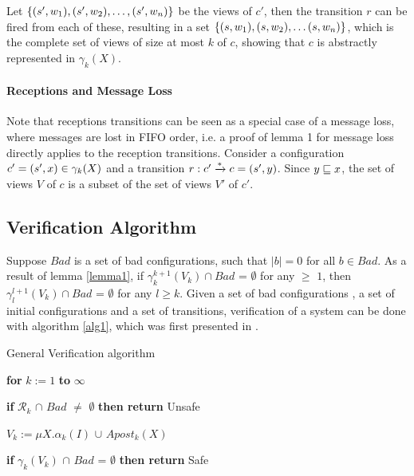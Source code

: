 Let $\{(s', w_1), (s', w_2), \ldots,  (s', w_n)\}$ be the views of $c'$, then the transition $r$ can be fired from each of these, resulting in a set $\{(s, w_1), (s, w_2),\ldots (s, w_n)\}$, which is the complete set of views of size at most $k$ of $c$, showing that $c$ is abstractly represented in $\gamma_k(X)$.

\paragraph{Receptions and Message Loss}
Note that receptions transitions can be seen as a special case of a message loss, where messages are lost in FIFO order, i.e. a proof of lemma 1 for message loss directly applies to the reception transitions. Consider a configuration $c' = (s', x) \in \gamma_k(X)$ and a transition $r: c' \xrightarrow{*} c = (s', y)$. Since $y \sqsubseteq x$, the set of views $V$ of $c$ is a subset of the set of views $V'$ of $c'$.

\subsection{Verification Algorithm}
\label{verificationalgorithm}
Suppose $Bad$ is a set of bad configurations, such that $|b| = 0$ for all $b \in Bad$. As a result of lemma \ref{lemma1}, if $\gamma_k^{k+1}(V_k) \cap Bad$ = $\emptyset$ for any  $\geq$ $1$, then $\gamma_l^{l+1}(V_k) \cap Bad$ = $\emptyset$ for any $l \geq k$. Given a set of bad configurations , a set of initial configurations  and a set of transitions, verification of a system can be done with algorithm \ref{alg1}, which was first presented in \cite{parosh}.

\begin{algorithm}
\begin{algorithmic}[1]
  \caption{General Verification algorithm}
  \label{alg1}
    \State \hspace{8pt}\textbf{for} $k := 1$ \textbf{to} $\infty$

    \State \hspace{16pt}\textbf{if} $\mathcal{R}_k$ $\cap$ $Bad$ $\neq$ $\emptyset$ \textbf{then return} Unsafe

    \State \hspace{16pt}$V_k := \mu X.\alpha_k(I)$ $\cup$ $Apost_k(X)$

    \State \hspace{16pt}\textbf{if} {$\gamma_k(V_k)$ $\cap$ $Bad$ = $\emptyset$} \textbf{then return} Safe
\end{algorithmic}
\end{algorithm}

